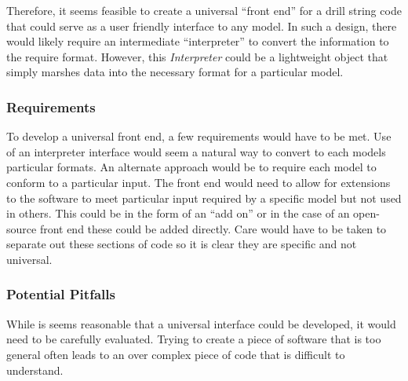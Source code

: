 Therefore, it seems feasible to create a universal ``front end'' for a drill string code that could serve as a user friendly interface to any model.  In such a design, there would likely require an intermediate ``interpreter'' to convert the information to the require format.  However, this \emph{Interpreter} could be a lightweight object that simply marshes data into the necessary format for a particular model.

\subsubsection{Requirements}
To develop a universal front end, a few requirements would have to be met.  Use of an interpreter interface would seem a natural way to convert to each models particular formats.  An alternate approach would be to require each model to conform to a particular input.  The front end would need to allow for extensions to the software to meet particular input required by a specific model but not used in others.  This could be in the form of an ``add on'' or in the case of an open-source front end these could be added directly.  Care would have to be taken to separate out these sections of code so it is clear they are specific and not universal.

\subsubsection{Potential Pitfalls}
While is seems reasonable that a universal interface could be developed, it would need to be carefully evaluated.  Trying to create a piece of software that is too general often leads to an over complex piece of code that is difficult to understand. 